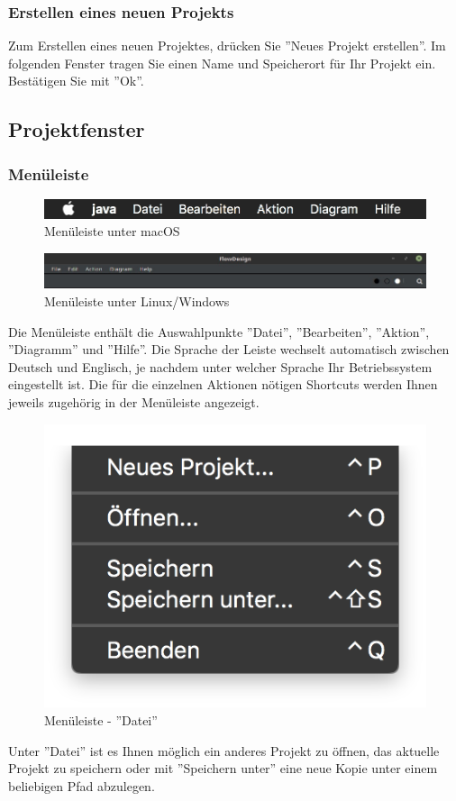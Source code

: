 \subsubsection{Erstellen eines neuen Projekts}
Zum Erstellen eines neuen Projektes, drücken Sie ''Neues Projekt erstellen''. Im folgenden Fenster tragen Sie einen Name und Speicherort für Ihr Projekt ein. Bestätigen Sie mit ''Ok''.


\subsection{Projektfenster}
\subsubsection{Menüleiste}
\begin{figure}[h!]
	\centering
	\includegraphics[width=1.0\textwidth]{Leiste.png}
	\caption{Menüleiste unter macOS}
\end{figure}

\begin{figure}[h!]
	\centering
	\includegraphics[width=1.0\textwidth]{Leiste2.jpg}
	\caption{Menüleiste unter Linux/Windows}
\end{figure}

Die Menüleiste enthält die Auswahlpunkte ''Datei'', ''Bearbeiten'', ''Aktion'', ''Diagramm'' und ''Hilfe''.
Die Sprache der Leiste wechselt automatisch zwischen Deutsch und Englisch, je nachdem unter welcher Sprache Ihr Betriebssystem eingestellt ist.
Die für die einzelnen Aktionen nötigen Shortcuts werden Ihnen jeweils zugehörig in der Menüleiste angezeigt. 




\begin{figure}[h!]
	\centering
	\includegraphics[width=.4\textwidth]{Leiste_Datei.png}
	\caption{Menüleiste - ''Datei''}
\end{figure}
Unter ''Datei'' ist es Ihnen möglich ein anderes Projekt zu öffnen, das aktuelle Projekt zu speichern oder mit ''Speichern unter'' eine neue Kopie unter einem beliebigen Pfad abzulegen.


